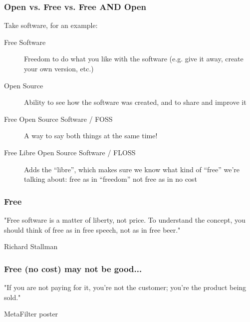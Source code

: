 \documentclass{beamer}
\begin{document}
\begin{frame}
\begin{overlayarea}{\textwidth}{\textheight}
\begin{center}
    \end{center}
  \end{overlayarea}
\end{frame}

\begin{frame}
  \frametitle{Open vs. Free vs. Free AND Open}

  Take software, for an example: 

  \begin{description}
  \item[Free Software] Freedom to do what you like with the software (e.g. give it away, create your own version, etc.)
  \item[Open Source] Ability to see how the software was created, and to share and improve it
  \item[Free Open Source Software / FOSS] A way to say both things at the same time!
  \item[Free Libre Open Source Software / FLOSS] Adds the ``libre'', which makes sure we know what kind of ``free'' we're talking about: free as in ``freedom'' not free as in no cost
  \end{description}
\end{frame}

\begin{frame}
  \frametitle{Free}
  \begin{LARGE}
    "Free software is a matter of liberty, not price. To understand
    the concept, you should think of free as in free speech, not as in
    free beer."

    \vspace{1em}

    \textemdash Richard Stallman
  \end{LARGE}

\end{frame}

\begin{frame}
  \frametitle{Free (no cost) may not be good...}
  \begin{LARGE}
    "If you are not paying for it, you’re not the customer; you’re the product being sold."

    \vspace{1em}

    \textemdash MetaFilter poster
  \end{LARGE}
\end{frame}
\end{document}
